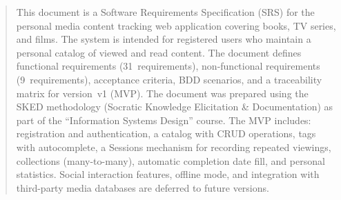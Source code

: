 \documentclass[profile=ieee,lang=en]{skedreport}
\begin{document}
\skedmaketitle

\begin{abstract}
This document is a Software Requirements Specification (SRS) for the personal media content tracking web application covering books, TV series, and films. The system is intended for registered users who maintain a personal catalog of viewed and read content. The document defines functional requirements (31~requirements), non-functional requirements (9~requirements), acceptance criteria, BDD scenarios, and a traceability matrix for version~v1 (MVP). The document was prepared using the SKED methodology (Socratic Knowledge Elicitation \& Documentation) as part of the ``Information Systems Design'' course. The MVP includes: registration and authentication, a catalog with CRUD operations, tags with autocomplete, a Sessions mechanism for recording repeated viewings, collections (many-to-many), automatic completion date fill, and personal statistics. Social interaction features, offline mode, and integration with third-party media databases are deferred to future versions.
\end{abstract}

\skedtoc











\skedappendix



\skedbibliography
\end{document}
